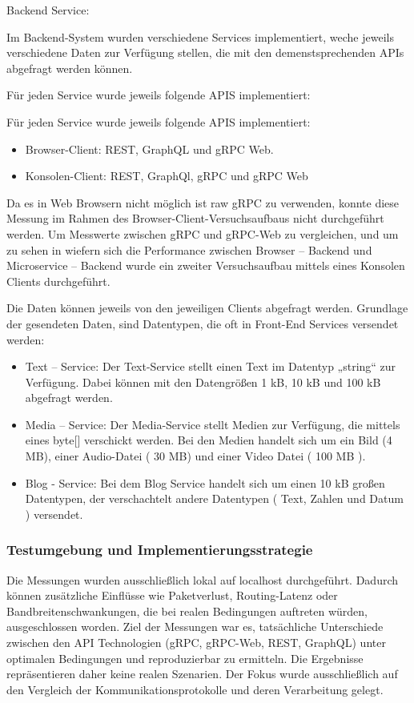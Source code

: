 Backend Service:

Im Backend-System wurden verschiedene Services implementiert, weche jeweils verschiedene Daten zur Verfügung stellen, die mit den demenstsprechenden APIs abgefragt werden können. 

Für jeden Service wurde jeweils folgende APIS implementiert:

Für jeden Service wurde jeweils folgende APIS implementiert:

\begin{itemize}
	\item Browser-Client: REST, GraphQL und gRPC Web. 
	\item Konsolen-Client: REST, GraphQl, gRPC und gRPC Web
\end{itemize}

Da es in Web Browsern nicht möglich ist raw gRPC zu verwenden, konnte diese Messung im Rahmen des Browser-Client-Versuchsaufbaus nicht durchgeführt werden. Um Messwerte zwischen gRPC und gRPC-Web zu vergleichen, und um zu sehen in wiefern sich die Performance zwischen Browser – Backend und Microservice – Backend wurde ein zweiter Versuchsaufbau mittels eines Konsolen Clients durchgeführt.

Die Daten können jeweils von den jeweiligen Clients abgefragt werden. Grundlage der gesendeten Daten, sind Datentypen, die oft in Front-End Services versendet werden:

\begin{itemize}
	\item Text – Service: 
	Der Text-Service stellt einen Text im Datentyp „string“ zur Verfügung. Dabei können mit den Datengrößen 1 kB, 10 kB und 100 kB abgefragt werden.
	
	\item Media – Service:
	Der Media-Service stellt Medien zur Verfügung, die mittels eines byte[] verschickt werden. Bei den Medien handelt sich um ein Bild (4 MB), einer Audio-Datei ( 30 MB) und einer Video Datei ( 100 MB ). 
	
	\item Blog - Service: 
	Bei dem Blog Service handelt sich um einen 10 kB großen Datentypen, der verschachtelt andere Datentypen ( Text, Zahlen und Datum ) versendet.
	
\end{itemize}

\subsubsection{Testumgebung und Implementierungsstrategie}
Die Messungen wurden ausschließlich lokal auf localhost durchgeführt. Dadurch können zusätzliche Einflüsse wie Paketverlust, Routing-Latenz oder Bandbreitenschwankungen, die bei realen Bedingungen auftreten würden, ausgeschlossen worden. Ziel der Messungen war es, tatsächliche Unterschiede zwischen den API Technologien (gRPC, gRPC-Web, REST, GraphQL) unter optimalen Bedingungen und reproduzierbar zu ermitteln.
Die Ergebnisse repräsentieren daher keine realen Szenarien. Der Fokus wurde ausschließlich auf den Vergleich der Kommunikationsprotokolle und deren Verarbeitung gelegt.

